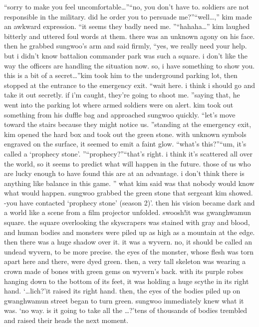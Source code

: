 “sorry to make you feel uncomfortable…”“no, you don’t have to.
 soldiers are not responsible in the military.
 did he order you to persuade me?”“well…,” kim made an awkward expression.
“it seems they badly need me.
”“hahaha…” kim laughed bitterly and uttered foul words at them.
there was an unknown agony on his face.
 then he grabbed sungwoo’s arm and said firmly, “yes, we really need your help.
 but i didn’t know battalion commander park was such a square.
 i don’t like the way the officers are handling the situation now.
 so, i have something to show you.
 this is a bit of a secret…”kim took him to the underground parking lot, then stopped at the entrance to the emergency exit.
“wait here.
 i think i should go and take it out secretly.
 if i’m caught, they’re going to shoot me.
”saying that, he went into the parking lot where armed soldiers were on alert.
 kim took out something from his duffle bag and approached sungwoo quickly.
“let’s move toward the stairs because they might notice us.
”standing at the emergency exit, kim opened the hard box and took out the green stone.
with unknown symbols engraved on the surface, it seemed to emit a faint glow.
“what’s this?”“um, it’s called a ‘prophecy stone’.
”“prophecy?”“that’s right.
 i think it’s scattered all over the world, so it seems to predict what will happen in the future.
 those of us who are lucky enough to have found this are at an advantage.
 i don’t think there is anything like balance in this game.
”
what kim said was that nobody would know what would happen.
sungwoo grabbed the green stone that sergeant kim showed.
-you have contacted ‘prophecy stone’ (season 2)’.
then his vision became dark and a world like a scene from a film projector unfolded.
swoosh!it was gwanghwamun square.
 the square overlooking the skyscrapers was stained with gray and blood, and human bodies and monsters were piled up as high as a mountain at the edge.
 then there was a huge shadow over it.
 it was a wyvern.
 no, it should be called an undead wyvern, to be more precise.
 the eyes of the monster, whose flesh was torn apart here and there, were dyed green.
 then, a very tall skeleton was wearing a crown made of bones with green gems on wyvern’s back.
 with its purple robes hanging down to the bottom of its feet, it was holding a huge scythe in its right hand.
‘…lich?’it raised its right hand.
 then, the eyes of the bodies piled up on gwanghwamun street began to turn green.
 sungwoo immediately knew what it was.
‘no way.
 is it going to take all the …?’tens of thousands of bodies trembled and raised their heads the next moment.
